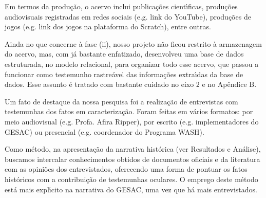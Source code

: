 \documentclass[
12pt,		%
openright,	%
twoside,  %
a4paper,			%
chapter=TITLE,		%
english,			%
french,				%
spanish,			%
brazil				%
]{USPSC-classe/USPSC}
\begin{document}
Em termos da produ\c{c}\~ao, o acervo inclui publica\c{c}\~oes cient\'{\i}ficas, produ\c{c}\~oes audiovisuais registradas em redes sociais (e.g. link do YouTube), produ\c{c}\~oes de jogos (e.g. link dos jogos na plataforma do Scratch), entre outras.

















Ainda no que concerne \`a fase (ii), nosso projeto n\~ao ficou restrito \`a armazenagem do acervo, mas, com j\'a bastante enfatizado, desenvolveu uma base de dados estruturada, no modelo relacional, para organizar todo esse acervo, que passou a funcionar como testemunho rastre\'avel das informa\c{c}\~oes extra\'{\i}das da base de dados. Esse assunto \'e tratado com bastante cuidado no eixo 2 e no Ap\^endice B.

















Um fato de destaque da nossa pesquisa foi a realiza\c{c}\~ao de entrevistas com testemunhas dos fatos em caracteriza\c{c}\~ao. Foram feitas em v\'arios formatos: por meio audiovisual (e.g. Profa. Afira Ripper), por escrito (e.g. implementadores do GESAC) ou presencial (e.g. coordenador do Programa WASH).

















Como m\'etodo, na apresenta\c{c}\~ao da narrativa hist\'orica (ver Resultados e An\'alise), buscamos intercalar conhecimentos obtidos de documentos oficiais e da literatura com as opini\~oes dos entrevistados, oferecendo uma forma de pontuar os fatos hist\'oricos com a contribui\c{c}\~ao de testemunhas oculares. O emprego deste m\'etodo est\'a mais expl\'{\i}cito na narrativa do GESAC, uma vez que h\'a mais entrevistados.
\end{document}
